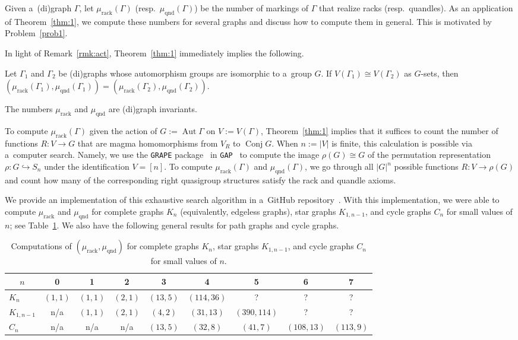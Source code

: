 \documentclass{jonasart}
\DeclareMathOperator{\Aut}{Aut}
\DeclareMathOperator{\Conj}{Conj}
\DeclareMathOperator{\qnd}{qnd}
\DeclareMathOperator{\rack}{rack}
\begin{document}
    Given a~(di)graph $\Gamma$, let $\mu_{\rack}(\Gamma)$ (resp.\ $\mu_{\qnd}(\Gamma)$) be the number of markings of $\Gamma$ that realize racks (resp.\ quandles). As an application of Theorem~\ref{thm:1}, we compute these numbers for several graphs and discuss how to compute them in general. This is motivated by Problem~\ref{prob1}.

	In light of Remark~\ref{rmk:act}, Theorem~\ref{thm:1} immediately implies the following.
    
	\begin{corollary}\label{cor:g-sets}
		Let $\Gamma_1$ and $\Gamma_2$ be (di)graphs whose automorphism groups are isomorphic to a~group $G$. If $V(\Gamma_1 )\cong V(\Gamma_2 )$ as $G$-sets, then $(\mu_{\rack}(\Gamma_1 ),\mu_{\qnd}(\Gamma_1 ))=(\mu_{\rack}(\Gamma_2 ),\mu_{\qnd}(\Gamma_2 ))$.
	\end{corollary}

	\begin{corollary}
		The numbers $\mu_{\rack}$ and $\mu_{\qnd}$ are (di)graph invariants.
	\end{corollary}
    
	To compute $\mu_{\rack}(\Gamma)$ given the action of $G:=\Aut \Gamma$ on $V:=V(\Gamma)$, Theorem~\ref{thm:1} implies that it suffices to count the number of functions $R:V\to G$ that are magma homomorphisms from $V_R$ to $\Conj G$. When $n:=|V|$ is finite, this calculation is possible via a~computer search. Namely, we use the \texttt{GRAPE} package~\cite{GRAPE} in \texttt{GAP}~\cite{GAP4} to compute the image $\rho(G)\cong G$ of the permutation representation $\rho:G\hookrightarrow S_n$ under the identification $V=[n]$. To compute $\mu_{\rack}(\Gamma)$ and $\mu_{\qnd}(\Gamma)$, we go through all $|G|^n$ possible functions $R:V\to \rho(G)$ and count how many of the corresponding right quasigroup structures satisfy the rack and quandle axioms.

	We provide an implementation of this exhaustive search algorithm in a~GitHub repository~\cite{code}. With this implementation, we were able to compute $\mu_{\rack}$ and $\mu_{\qnd}$ for complete graphs $K_n$ (equivalently, edgeless graphs), star graphs $K_{1,n-1}$, and cycle graphs $C_n$ for small values of $n$; see Table~\ref{tab1}. We also have the following general results for path graphs and cycle graphs.
	\begin{table}
		[]
		\centering
		\begin{tabular}
			{l|cccccccc}
			\multicolumn{1}{c|}{$n$} & 0 & 1 & 2 & 3 & 4 & 5 & 6 & 7 \\ \hline
			$K_n$ & $(1,1)$ & $(1,1)$ & $(2,1)$ & $(13,5)$ & $(114,36)$ &? &? &? \\
			$K_{1,n-1}$ & n/a & $(1,1)$ & $(2,1)$ & $(4,2)$ & $(31,13)$ & $(390,114)$ &? &? \\
			$C_n$ & n/a & n/a & n/a & $(13,5)$ & $(32,8)$ & $(41,7)$ & $(108,13)$ & $(113,9)$
		\end{tabular}
		\caption{Computations of $(\mu_{\rack},\mu_{\qnd})$ for complete graphs $K_n$, star graphs $K_{1,n-1}$, and cycle graphs $C_n$ for small values of $n$.}
		\label{tab1}
	\end{table}
\end{document}
